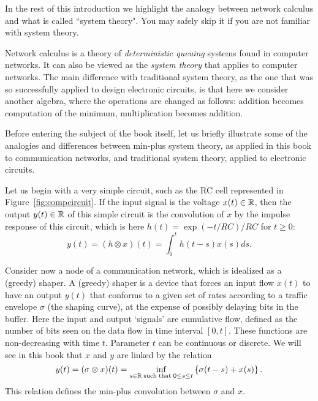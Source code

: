 In the rest of this introduction we highlight the analogy between
network calculus and what is called ``system theory". You may
safely skip it if you are not familiar with system theory.

Network calculus is a theory of {\em deterministic queuing}
systems found in computer networks. It can also be viewed as the
{\em system theory} that applies to computer networks. The main
difference with traditional system theory, as the one that was so
successfully applied to design electronic circuits, is that here
we consider another algebra, where the operations are changed as
follows: addition becomes computation of the minimum,
multiplication becomes addition.

Before entering the subject of the book itself, let us briefly
illustrate some of the analogies and differences between min-plus
system theory, as applied in this book to communication networks,
and traditional system theory, applied to electronic circuits.

Let us begin with a very simple circuit, such as the RC cell represented in Figure~\ref{fig:compcircuit}.
If the input signal is the voltage $x(t) \in \mathbb{R}$, then the output $y(t) \in \mathbb{R}$
of this simple circuit is the convolution of $x$ by the impulse response of this circuit,
which is here $h(t) = \exp(-t/RC)/RC$ for $t \geq 0$:
$$ y(t) =  (h \otimes x)(t) = \int_{0}^{t} h(t-s)x(s) ds.  $$

Consider now a node of a communication network, which is idealized as a (greedy) shaper. A
(greedy) shaper is a device that forces an input flow $x(t)$ to have an output $y(t)$ that
conforms to a given set of rates according to a traffic envelope $\sigma$ (the shaping curve),
at the expense of possibly delaying bits in the buffer.
Here the input and output `signals' are cumulative flow, defined as the number of bits
seen on the data flow in time interval $[0,t]$. These functions are non-decreasing with time $t$.
Parameter $t$ can be continuous or discrete.
We will see in this book that $x$ and $y$ are linked by the relation
$$ y(t) =  (\sigma \otimes x)(t) = \inf_{s \in \mathbb{R} \mathrm{\; such \; that \; } 0 \leq s \leq t} \left\{ \sigma(t-s) + x(s) \right\}. $$
This relation defines the min-plus convolution between $\sigma$ and $x$.

\begin{figure}[!h]
  
\end{figure}



